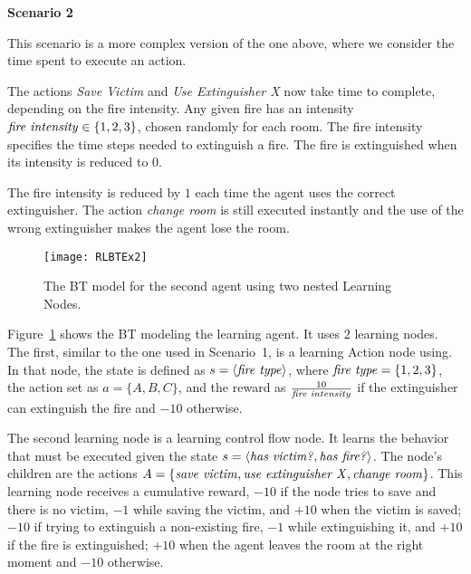 \textbf{Scenario 2}

This scenario is a more complex version of the one above, where we consider the time spent to execute an action.

The actions \emph{Save Victim} and \emph{Use Extinguisher X} now take time to complete, depending on the fire intensity. Any given fire has an intensity $\text{\emph{fire intensity}} \in \{1, 2, 3\}$, chosen randomly for each room. The fire intensity specifies the time steps needed to extinguish a fire. The fire is extinguished when its intensity is reduced to $0$.

The fire intensity is reduced by $1$ each time the agent uses the correct extinguisher. The action \emph{change room} is still executed instantly and the use of the wrong extinguisher makes the agent lose the room. 

\begin{figure}
  \centering
  \texttt{[image: RLBTEx2]}
  \caption{The BT model for the second agent using two nested Learning Nodes.}
  \label{fig:model_scenario2}
\end{figure}

Figure~\ref{fig:model_scenario2} shows the BT modeling the learning agent. 
It uses $2$ learning nodes. The first, similar to the one used in Scenario~1, is a learning Action node using. In that node, the state is defined as $s = \langle \text{\emph{fire type}} \rangle$, where $\text{\emph{fire type}} = \{1, 2, 3\}$,  the action set as $a = \{A, B, C\}$, and the reward as $\frac{10}{\text{\emph{fire intensity}}}$ if the extinguisher can extinguish the fire and $-10$ otherwise.


The second learning node is a learning control flow node. It learns the behavior that must be executed given the state $s = \langle \text{\emph{has victim?}}, \text{\emph{has fire?}}\rangle$. The node's children are the actions $A = \{\text{\emph{save victim}}, \text{\emph{use extinguisher X}}, \text{\emph{change room}}\}$. 
This learning node receives a cumulative reward, $-10$ if the node tries to save and there is no victim, $-1$ while saving the victim, and $+10$ when the victim is saved; $-10$ if trying to extinguish a non-existing fire, $-1$ while extinguishing it, and $+10$ if the fire is extinguished;  $+10$ when the agent leaves the room at the right moment and $-10$ otherwise.

